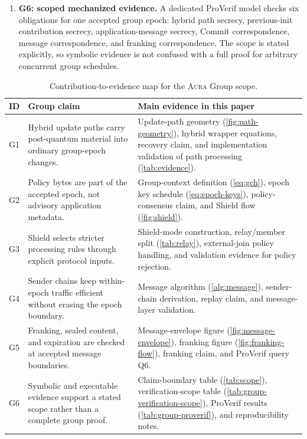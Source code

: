 \documentclass[preprint,12pt]{elsarticle}
\theoremstyle{definition}
\newcommand{\tech}[1]{\textnormal{#1}}
\newcommand{\Aura}{\textsc{Aura}}
\newcommand{\Shield}{\tech{Shield}}
\newcommand{\ProVerif}{\tech{ProVerif}}
\begin{document}
\begin{enumerate}
  \item \textbf{G6: scoped mechanized evidence.} A dedicated \ProVerif{} model
  checks six obligations for one accepted group epoch: hybrid path secrecy,
  previous-init contribution secrecy, application-message secrecy, Commit
  correspondence, message correspondence, and franking correspondence. The
  scope is stated explicitly, so symbolic evidence is not confused with a full
  proof for arbitrary concurrent group schedules.
\end{enumerate}

\begin{table}[H]
\centering
\caption{Contribution-to-evidence map for the \Aura{} Group scope.}
\label{tab:group-contribution-map}
\footnotesize
\setlength{\tabcolsep}{2pt}
\begin{tabularx}{\textwidth}{@{}L{0.08\textwidth}L{0.30\textwidth}Y@{}}
\toprule
ID & Group claim & Main evidence in this paper \\
\midrule
G1 & Hybrid update paths carry post-quantum material into ordinary group-epoch changes. & Update-path geometry (\cref{fig:path-geometry}), hybrid wrapper equations, recovery claim, and implementation validation of path processing (\cref{tab:evidence}). \\
G2 & Policy bytes are part of the accepted epoch, not advisory application metadata. & Group-context definition (\cref{eq:gch}), epoch key schedule (\cref{eq:epoch-keys}), policy-consensus claim, and \Shield{} flow (\cref{fig:shield}). \\
G3 & \Shield{} selects stricter processing rules through explicit protocol inputs. & Shield-mode construction, relay/member split (\cref{tab:relay}), external-join policy handling, and validation evidence for policy rejection. \\
G4 & Sender chains keep within-epoch traffic efficient without erasing the epoch boundary. & Message algorithm (\cref{alg:message}), sender-chain derivation, replay claim, and message-layer validation. \\
G5 & Franking, sealed content, and expiration are checked at accepted message boundaries. & Message-envelope figure (\cref{fig:message-envelope}), franking figure (\cref{fig:franking-flow}), franking claim, and ProVerif query Q6. \\
G6 & Symbolic and executable evidence support a stated scope rather than a complete group proof. & Claim-boundary table (\cref{tab:scope}), verification-scope table (\cref{tab:group-verification-scope}), ProVerif results (\cref{tab:group-proverif}), and reproducibility notes. \\
\bottomrule
\end{tabularx}
\end{table}
\end{document}
